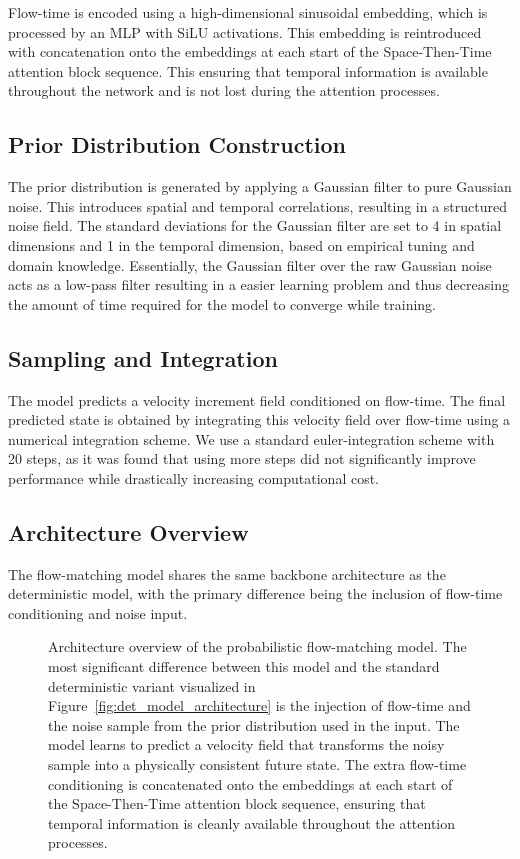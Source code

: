 Flow-time is encoded using a high-dimensional sinusoidal embedding, which is processed by an MLP with SiLU activations. This embedding is reintroduced with concatenation onto the embeddings at each start of the Space-Then-Time attention block sequence. This ensuring that temporal information is available throughout the network and is not lost during the attention processes.

\subsection{Prior Distribution Construction}

The prior distribution is generated by applying a Gaussian filter to pure Gaussian noise. This introduces spatial and temporal correlations, resulting in a structured noise field. The standard deviations for the Gaussian filter are set to 4 in spatial dimensions and 1 in the temporal dimension, based on empirical tuning and domain knowledge. Essentially, the Gaussian filter over the raw Gaussian noise acts as a low-pass filter resulting in a easier learning problem and thus decreasing the amount of time required for the model to converge while training. 

\subsection{Sampling and Integration}

The model predicts a velocity increment field conditioned on flow-time. The final predicted state is obtained by integrating this velocity field over flow-time using a numerical integration scheme. We use a standard euler-integration scheme with 20 steps, as it was found that using more steps did not significantly improve performance while drastically increasing computational cost. 

\subsection{Architecture Overview}

The flow-matching model shares the same backbone architecture as the deterministic model, with the primary difference being the inclusion of flow-time conditioning and noise input.

\begin{figure}[h]
	\centering
	\makebox[\textwidth][c]{
		
	}
	\caption{Architecture overview of the probabilistic flow-matching model. The most significant difference between this model and the standard deterministic variant visualized in Figure~\ref{fig:det_model_architecture} is the injection of flow-time and the noise sample from the prior distribution used in the input. The model learns to predict a velocity field that transforms the noisy sample into a physically consistent future state. The extra flow-time conditioning is concatenated onto the embeddings at each start of the Space-Then-Time attention block sequence, ensuring that temporal information is cleanly available throughout the attention processes.}
	\label{fig:fm_model_architecture}
\end{figure}

